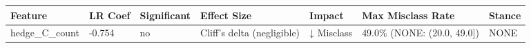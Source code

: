 \begin{tabular}{lllllll}
\toprule
Feature & LR Coef & Significant & Effect Size & Impact & Max Misclass Rate & Stance \\
\midrule
hedge\_C\_count & -0.754 & no & Cliff's delta (negligible) & ↓ Misclass & 49.0\% (NONE: (20.0, 49.0]) & NONE \\
\bottomrule
\end{tabular}
